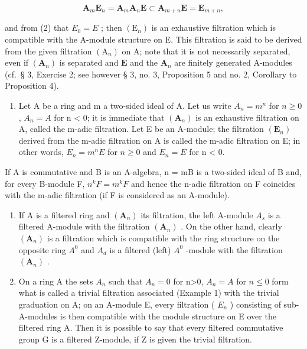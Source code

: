 \[
\mathbf {A} _ {m} \mathbf {E} _ {n} = \mathbf {A} _ {m} \mathbf {A} _ {n} \mathbf {E} \subset \mathbf {A} _ {m + n} \mathbf {E} = \mathbf {E} _ {m + n},
\]

and from (2) that \(E_{0} = E\) ; then \((\mathrm{E}_{n})\) is an exhaustive filtration which is compatible with the A-module structure on E. This filtration is said to be derived from the given filtration \((\mathrm{A}_{n})\) on A; note that it is not necessarily separated, even if \((\mathbf{A}_n)\) is separated and \(\mathbf{E}\) and the \(\mathbf{A}_n\) are finitely generated A-modules (cf.~§ 3, Exercise 2; see however § 3, no. 3, Proposition 5 and no. 2, Corollary to Proposition 4).

\begin{enumerate}
\def\labelenumi{(\arabic{enumi})}
\setcounter{enumi}{2}
\tightlist
\item
  Let A be a ring and m a two-sided ideal of A. Let us write \(A_{n} = m^{n}\) for \(n \geqslant 0\) , \(A_{n} = A\) for n \textless{} 0; it is immediate that \((\mathbf{A}_{n})\) is an exhaustive filtration on A, called the m-adic filtration. Let E be an A-module; the filtration \((\mathbf{E}_{n})\) derived from the m-adic filtration on A is called the m-adic filtration on E; in other words, \(E_{n} = m^{n}E\) for \(n \geqslant 0\) and \(E_{n} = E\) for n \textless{} 0.
\end{enumerate}

If A is commutative and B is an A-algebra, n = mB is a two-sided ideal of B and, for every B-module F, \(n^{k}F = m^{k}F\) and hence the n-adic filtration on F coincides with the m-adic filtration (if F is considered as an A-module).

\begin{enumerate}
\def\labelenumi{(\arabic{enumi})}
\setcounter{enumi}{3}
\item
  If A is a filtered ring and \((\mathbf{A}_{n})\) its filtration, the left A-module \(A_{s}\) is a filtered A-module with the filtration \((\mathbf{A}_{n})\) . On the other hand, clearly \((\mathbf{A}_{n})\) is a filtration which is compatible with the ring structure on the opposite ring \(A^{0}\) and \(A_{d}\) is a filtered (left) \(A^{0}\) -module with the filtration \((\mathbf{A}_{n})\) .
\item
  On a ring A the sets \(A_{n}\) such that \(A_{n}=0\) for n\textgreater0, \(A_{n}=A\) for \(n\leqslant0\) form what is called a trivial filtration associated (Example 1) with the trivial graduation on A; on an A-module E, every filtration ( \(E_{n}\) ) consisting of sub-A-modules is then compatible with the module structure on E over the filtered ring A. Then it is possible to say that every filtered commutative group G is a filtered Z-module, if Z is given the trivial filtration.
\end{enumerate}

